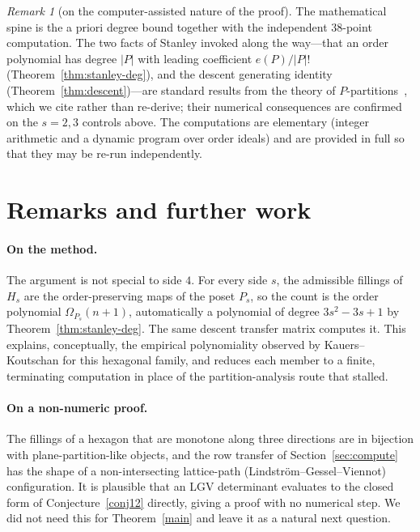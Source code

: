 \documentclass[11pt]{article}
\theoremstyle{plain}
\theoremstyle{definition}
\theoremstyle{remark}
\newtheorem{remark}[theorem]{Remark}
\newcommand{\Om}{\Omega}
\begin{document}
\begin{remark}[on the computer-assisted nature of the proof]\label{rem:assist}
The mathematical spine is the a priori degree bound together with the independent $38$-point
computation. The two facts of Stanley invoked along the way---that an order polynomial has
degree $|P|$ with leading coefficient $e(P)/|P|!$ (Theorem~\ref{thm:stanley-deg}), and the
descent generating identity (Theorem~\ref{thm:descent})---are standard results from the theory
of $P$-partitions~\cite[\S3.15]{EC1}, which we cite rather than re-derive; their numerical
consequences are confirmed on the $s=2,3$ controls above. The computations are elementary
(integer arithmetic and a dynamic program over order ideals) and are provided in full so that
they may be re-run independently.
\end{remark}

\section{Remarks and further work}

\paragraph{On the method.} The argument is not special to side $4$. For every side $s$, the
admissible fillings of $H_s$ are the order-preserving maps of the poset $P_s$, so the count is
the order polynomial $\Om_{P_s}(n+1)$, automatically a polynomial of degree $3s^2-3s+1$ by
Theorem~\ref{thm:stanley-deg}. The same descent transfer matrix computes it. This explains,
conceptually, the empirical polynomiality observed by Kauers--Koutschan for this hexagonal
family, and reduces each member to a finite, terminating computation in place of the
partition-analysis route that stalled.

\paragraph{On a non-numeric proof.} The fillings of a hexagon that are monotone along three
directions are in bijection with plane-partition-like objects, and the row transfer of
Section~\ref{sec:compute} has the shape of a non-intersecting lattice-path
(Lindstr\"om--Gessel--Viennot) configuration. It is plausible that an LGV determinant evaluates
to the closed form of Conjecture~\ref{conj12} directly, giving a proof with no numerical step.
We did not need this for Theorem~\ref{main} and leave it as a natural next question.
\end{document}
